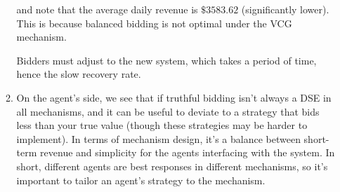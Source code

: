 \documentclass[11pt]{article}
\begin{document}
\begin{enumerate}[resume]
\begin{enumerate}
  and note that the average daily revenue is $\$3583.62$ (significantly lower). This is because balanced bidding is not optimal under the VCG mechanism.
  
  Bidders must adjust to the new system, which takes a period of time, hence the slow recovery rate.
  \item On the agent's side, we see that if truthful bidding isn't always a DSE in all mechanisms, and it can be useful to deviate to a strategy that bids less than your true value (though these strategies may be harder to implement). In terms of mechanism design, it's a balance between short-term revenue and simplicity for the agents interfacing with the system. In short, different agents are best responses in different mechanisms, so it's important to tailor an agent's strategy to the mechanism.
  \end{enumerate}
\end{enumerate}
\end{document}
